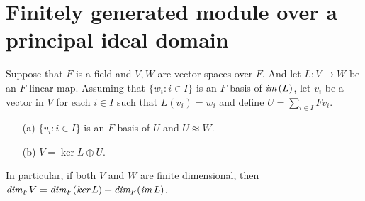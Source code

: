 \section{Finitely generated module over a principal ideal domain}

\begin{rmk}
    Suppose that $F$ is a field and $V, W$ are vector spaces over $F$.
    And let $L: V\rightarrow W$ be an $F$-linear map.
    Assuming that $\{w_i:i\in I\}$ is an $F$-basis of $\textit{im\,}(L)$, let $v_i$ be a vector in $V$ for each $i\in I$ such that $L(v_i)=w_i$ and define $U=\sum_{i\in I}Fv_i$.
    \begin{enumerate}
        \item[(a)]
        {
            $\{v_i: i\in I\}$ is an $F$-basis of $U$ and $U\approx W$.
        }
        \item[(b)]
        {
            $V=\ker L\oplus U$.
        }
    \end{enumerate}
    In particular, if both $V$ and $W$ are finite dimensional, then $\textit{dim}_F V=\textit{dim}_F(\textit{ker\,} L)+\textit{dim}_F(\textit{im\,} L)$.
\end{rmk}


